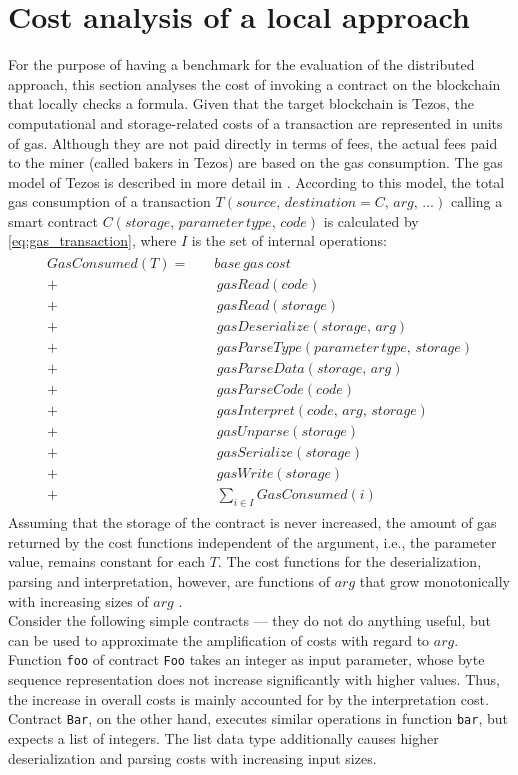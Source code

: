 \section{Cost analysis of a local approach}\label{sec:usecase_cost}
For the purpose of having a benchmark for the evaluation of the distributed approach, this section analyses the cost of invoking a contract on the blockchain that locally checks a formula. Given that the target blockchain is Tezos, the computational and storage-related costs of a transaction are represented in units of gas. Although they are not paid directly in terms of fees, the actual fees paid to the miner (called bakers in Tezos) are based on the gas consumption. The gas model of Tezos is described in more detail in . According to this model, the total gas consumption of a transaction $T(source,\, destination=C,\, arg, \, ...)$ calling a smart contract $C(storage, \, parameter\, type, \, code)$ is calculated by \eqref{eq:gas_transaction}, where $I$ is the set of internal operations:
\begin{align}\label{eq:gas_transaction}
\begin{split}
GasConsumed(T) = \quad &base \, gas \, cost \\
+& \, gasRead(code) \\
+& \, gasRead(storage) \\
+& \, gasDeserialize(storage, \, arg) \\
+& \, gasParseType(parameter \, type, \, storage) \\
+& \, gasParseData(storage, \, arg) \\
+& \, gasParseCode(code) \\
+& \, gasInterpret(code, \, arg, \, storage) \\
+& \, gasUnparse(storage) \\
+& \, gasSerialize(storage) \\
+& \, gasWrite(storage) \\
+& \, \sum_{i \in I} GasConsumed(i)
\end{split}
\end{align}
Assuming that the storage of the contract is never increased, the amount of gas returned by the cost functions independent of the argument, i.e., the parameter value, remains constant for each $T$. The cost functions for the deserialization, parsing and interpretation, however, are functions of $arg$ that grow monotonically with increasing sizes of $arg$ \cite{morley_gasmodel}\cite{tezos_repo}. \\
Consider the following simple contracts --- they do not do anything useful, but can be used to approximate the amplification of costs with regard to $arg$. Function \texttt{foo} of contract \texttt{Foo} takes an integer as input parameter, whose byte sequence representation does not increase significantly with higher values. Thus, the increase in overall costs is mainly accounted for by the interpretation cost. Contract \texttt{Bar}, on the other hand, executes similar operations in function \texttt{bar}, but expects a list of integers. The list data type additionally causes higher deserialization and parsing costs with increasing input sizes. 
